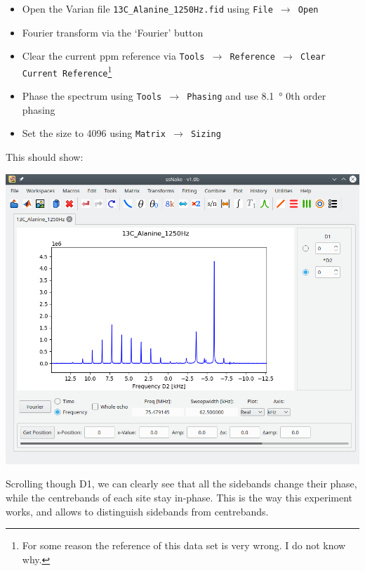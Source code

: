 \documentclass[11pt,a4paper]{article}
\begin{document}
\begin{itemize}
  \item Open the Varian file \texttt{13C\_Alanine\_1250Hz.fid} using \texttt{File $\longrightarrow$
	 Open}
  \item Fourier transform via the `Fourier' button
  \item Clear the current ppm reference via \texttt{Tools $\longrightarrow$ Reference
	 $\longrightarrow$ Clear Current Reference}\footnote{For some reason the reference of this data
	 set is very wrong. I do not know why.}
  \item Phase the spectrum using \texttt{Tools $\longrightarrow$ Phasing} and use \SI{8.1}{\degree}
	 0th order phasing
  \item Set the size to 4096 using \texttt{Matrix $\longrightarrow$ Sizing}
\end{itemize}
This should show: 
\begin{center}
\includegraphics[width=0.8\linewidth]{Figs/Fig1.png}
\end{center}
Scrolling though D1, we can clearly see that all the sidebands change their phase, while the
centrebands of each site stay in-phase. This is the way this experiment works, and allows to
distinguish sidebands from centrebands.
\end{document}
